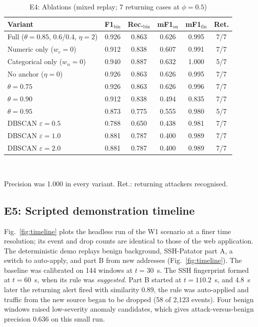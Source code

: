 \documentclass[conference]{IEEEtran}
\begin{document}
\begin{table}[t]
\centering
\caption{E4: Ablations (mixed replay; 7 returning cases at $\phi=0.5$)}
\label{tab:abl}
\footnotesize
\setlength{\tabcolsep}{3pt}
\begin{tabular}{@{}lccccc@{}}
\toprule
Variant & F1$_{\mathrm{bin}}$ & Rec.$_{\mathrm{bin}}$ & mF1$_{\mathrm{on}}$ & mF1$_{\mathrm{fin}}$ & Ret. \\
\midrule
Full ($\theta{=}0.85$, 0.6/0.4, $\eta{=}2$) & 0.926 & 0.863 & 0.626 & 0.995 & 7/7 \\
Numeric only ($w_c{=}0$) & 0.912 & 0.838 & 0.607 & 0.991 & 7/7 \\
Categorical only ($w_n{=}0$) & 0.940 & 0.887 & 0.632 & 1.000 & 5/7 \\
No anchor ($\eta{=}0$) & 0.926 & 0.863 & 0.626 & 0.995 & 7/7 \\
$\theta=0.75$ & 0.926 & 0.863 & 0.626 & 0.996 & 7/7 \\
$\theta=0.90$ & 0.912 & 0.838 & 0.494 & 0.835 & 7/7 \\
$\theta=0.95$ & 0.873 & 0.775 & 0.555 & 0.980 & 5/7 \\
DBSCAN $\varepsilon=0.5$ & 0.788 & 0.650 & 0.438 & 0.981 & 7/7 \\
DBSCAN $\varepsilon=1.0$ & 0.881 & 0.787 & 0.400 & 0.989 & 7/7 \\
DBSCAN $\varepsilon=2.0$ & 0.881 & 0.787 & 0.400 & 0.989 & 7/7 \\
\bottomrule
\end{tabular}\\[2pt]
\raggedright\scriptsize Precision was 1.000 in every variant. Ret.: returning attackers recognised.
\end{table}

\subsection{E5: Scripted demonstration timeline}
Fig.~\ref{fig:timeline} plots the headless run of the W1 scenario at a finer time resolution; its event and drop counts are identical to those of the web application. The deterministic demo replays benign background, SSH-Patator part A, a switch to auto-apply, and part B from new addresses (Fig.~\ref{fig:timeline}). The baseline was calibrated on 144 windows at $t=30$~s. The SSH fingerprint formed at $t=60$~s, when its rule was \emph{suggested}. Part B started at $t=110.2$~s, and 4.8~s later the returning alert fired with similarity 0.89, the rule was auto-applied and traffic from the new source began to be dropped (58 of 2,123 events). Four benign windows raised low-severity anomaly candidates, which gives attack-versus-benign precision 0.636 on this small run.
\end{document}

